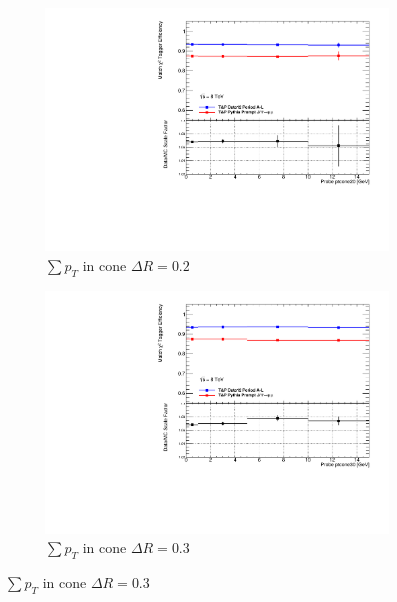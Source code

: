 \begin{figure}[phtb]
  \centering
    \begin{subfigure}[b]{0.60\textwidth}
      \includegraphics[width=\textwidth]{PartCalibration2012/Plots/SFPlots/ptcone20_smt.pdf}
      \caption{$\sum p_{T}$ in cone $\Delta R=0.2$} \label{fig:CalibrationIsoPtcone20}
    \end{subfigure}
    
    \begin{subfigure}[b]{0.60\textwidth}
      \includegraphics[width=\textwidth]{PartCalibration2012/Plots/SFPlots/ptcone30_smt.pdf}
      \caption{$\sum p_{T}$ in cone $\Delta R=0.3$} \label{fig:CalibrationIsoPtcone30}
    \end{subfigure}
    

\end{figure}
